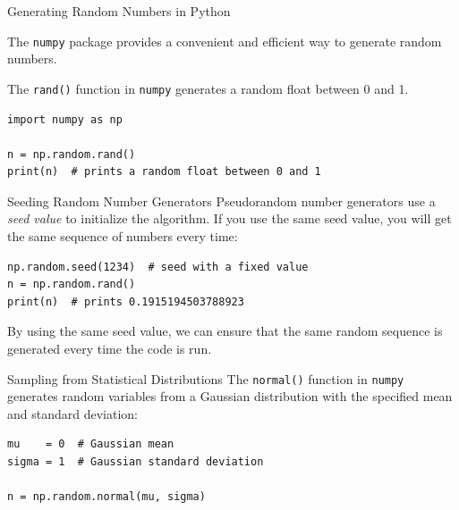 \documentclass{beamer}
\newcommand{\module}[1]{{\color{brown}\texttt{#1}}}
\newcommand{\code}[1]{{\color{blue}\texttt{#1}}}
\begin{document}
\begin{frame}[fragile]{Generating Random Numbers in Python}

The \module{numpy} package provides a convenient and efficient way to generate random numbers.

The \code{rand()} function in \module{numpy} generates a random float between 0 and 1.

\begin{lstlisting}[style=python]
import numpy as np

n = np.random.rand()
print(n)  # prints a random float between 0 and 1
\end{lstlisting}

\end{frame}

\begin{frame}[fragile]{Seeding Random Number Generators}
    Pseudorandom number generators use a \emph{seed value} to initialize the algorithm. If you use the same seed value, you will get the same sequence of numbers every time:

\begin{lstlisting}[style=python]
np.random.seed(1234)  # seed with a fixed value
n = np.random.rand()
print(n)  # prints 0.1915194503788923
\end{lstlisting}

By using the same seed value, we can ensure that the same random sequence is generated every time the code is run.

\end{frame}

\begin{frame}[fragile]{Sampling from Statistical Distributions}
The \code{normal()} function in \module{numpy} generates random variables from a Gaussian distribution with the specified mean and standard deviation:

\begin{lstlisting}[style=python]
mu    = 0  # Gaussian mean
sigma = 1  # Gaussian standard deviation

n = np.random.normal(mu, sigma)
\end{lstlisting}

\end{frame}
\end{document}
